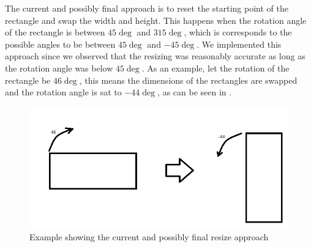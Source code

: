 The current and possibly final approach is to reset the starting point of the rectangle and swap the width and height.
This happens when the rotation angle of the rectangle is between $45\deg$ and $315\deg$, which is corresponds to the possible angles to be between $45\deg$ and $-45\deg$.
We implemented this approach since we observed that the resizing was reasonably accurate as long as the rotation angle was below $45\deg$.
As an example, let the rotation of the rectangle be $46\deg$, this means the dimensions of the rectangles are swapped and the rotation angle is sat to $-44\deg$, as can be seen in .
\begin{figure}
\includegraphics[scale=0.5]{media/approach6}
\caption{Example showing the current and possibly final resize approach}
\label{fig:app6}
\end{figure}
